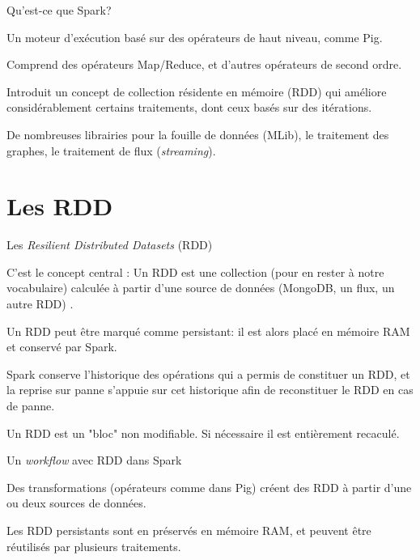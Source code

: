 
\begin{frame}{Qu'est-ce que Spark?}

Un \alert{moteur d'exécution} basé sur des opérateurs de haut niveau, comme Pig.

\vfill

Comprend des opérateurs Map/Reduce, et d'autres opérateurs de second ordre.

\vfill

\alert{Introduit un concept de collection résidente en mémoire} (RDD) 
qui améliore considérablement certains traitements, dont ceux basés sur des itérations.

\vfill
\begin{blocgauche}
De nombreuses librairies pour la fouille de données (MLib), le traitement des graphes,
le traitement de flux (\textit{streaming}).
\end{blocgauche}
\end{frame}

\section{Les RDD}

\begin{frame}{Les \textit{Resilient Distributed Datasets} (RDD)}

C'est le concept central : \alert{Un RDD est une collection (pour en rester à notre vocabulaire) calculée
à partir d'une source de données} (MongoDB, un flux, un autre RDD) .

\vfill

Un RDD peut être marqué comme \alert{persistant}: il est alors placé en mémoire RAM et conservé par Spark.
\vfill

Spark conserve
\alert{l'historique des opérations} qui a permis de constituer un RDD, et la reprise sur panne s'appuie
sur  cet historique afin de reconstituer  le RDD en cas de panne.

\vfill
\begin{blocgauche}
Un RDD est un "bloc" \alert{non modifiable}. Si nécessaire il est \alert{entièrement recaculé}.
\end{blocgauche}
\end{frame}


\begin{frame}{Un \textit{workflow} avec RDD dans Spark}

Des \alert{transformations} (opérateurs comme dans Pig) créent des RDD à partir d'une ou deux sources
de données.

\vfill


\vfill
\begin{blocgauche}
Les RDD persistants sont en préservés en mémoire RAM, et peuvent être réutilisés par plusieurs 
traitements.
\end{blocgauche}
\end{frame}

